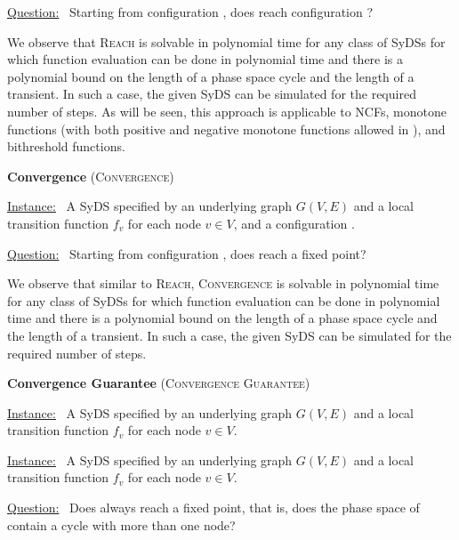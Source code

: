 \smallskip
\noindent
\underline{\textsf{Question:}}~ Starting from configuration \calc,
does  \cals{} reach configuration \cald? 

We observe that \textsc{Reach} is solvable in polynomial time for any class of SyDSs
for which function evaluation can be done in polynomial time and
there is a polynomial bound on the length of a phase space cycle and the length of a transient.
In such a case, the given SyDS can be simulated for the required number of steps.
As will be seen, this approach is applicable to NCFs,
monotone functions 
(with both positive and negative monotone functions allowed in \cals{}),
and bithreshold functions.

\medskip
\noindent
\textbf{Convergence} (\textsc{Convergence})

\smallskip
\noindent
\underline{\textsf{Instance:}}~ A SyDS \cals{} specified 
by an underlying
graph $G(V,E)$ and a local transition function $f_v$ for each node $v \in V$,
and a configuration \calc{}. 

\smallskip
\noindent
\underline{\textsf{Question:}}~ Starting from configuration \calc,
does  \cals{} reach a fixed point? 

We observe that similar to \textsc{Reach},
 \textsc{Convergence} is solvable in polynomial time for any class of SyDSs
for which function evaluation can be done in polynomial time and
there is a polynomial bound on the length of a phase space cycle and the length of a transient.
In such a case, the given SyDS can be simulated for the required number of steps.


\medskip
\noindent
\textbf{Convergence Guarantee} (\textsc{Convergence Guarantee})

\smallskip
\noindent
\underline{\textsf{Instance:}}~ A SyDS \cals{} specified 
by an underlying
graph $G(V,E)$ and a local transition function $f_v$ for each node $v \in V$. 

\smallskip
\noindent
\underline{\textsf{Instance:}}~ A SyDS \cals{} specified 
by an underlying
graph $G(V,E)$ and a local transition function $f_v$ for each node $v \in V$. 

\smallskip
\noindent
\underline{\textsf{Question:}}~ Does  \cals{} always reach a fixed point,
that is, does the phase space of  \cals{} contain a cycle with more than one node? 



